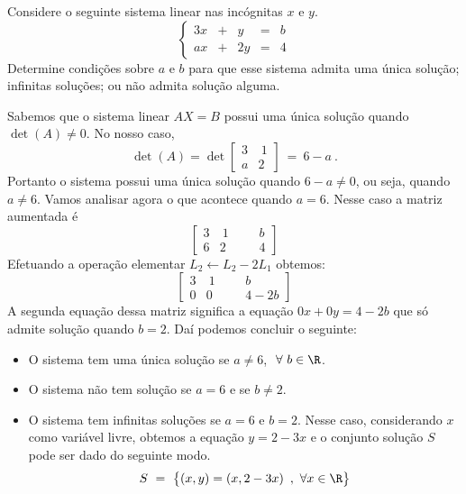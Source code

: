 \begin{problem} 
Considere o seguinte sistema linear nas incógnitas $x$ e $y$.
$$\left\{\begin{array}{rrrrrrr}
3x &  +  &   y &   = &  b  \\
ax &  +  &  2y &   = &  4  \end{array} \right.$$
Determine condições sobre $a$ e $b$ para que esse sistema admita uma única solução; \linebreak 
infinitas soluções; ou não admita solução alguma.
\end{problem}
\begin{solution} Sabemos que o sistema linear $AX=B$ possui uma única solução quando $\det(A) \neq 0$. No nosso caso,
$$ \det(A) = \det\left[\begin{array}{rrr}
  3 & \  1  \\
  a &    2  \end{array}\right]\ =\ 6-a\ . $$
Portanto o sistema possui uma única solução quando $6-a \neq 0$, ou seja, quando $a\neq 6$.
Vamos analisar agora o que acontece quando $a=6$. Nesse caso a matriz aumentada é
$$ \left[\begin{array}{rrr|rr}
  3 & \ 1  & & &   b  \\
  6 &   2  & & &   4  \end{array}\right] $$
Efetuando a operação elementar $L_2 \leftarrow L_2 - 2L_1$ obtemos:
$$ \left[\begin{array}{rrr|rc}
  3 & \ 1  & & &   b     \\
  0 &   0  & & &   4-2b  \end{array}\right] $$
A segunda equação dessa matriz significa a equação $0x+0y=4-2b$ que só admite solução quando $b=2$. Daí podemos concluir o seguinte:
\begin{itemize}
\item O sistema tem uma única solução se $a \neq 6$, $\ \forall\ b \in \R$.
\item O sistema não tem solução se $a=6$ e se $b \neq 2$.
\item O sistema tem infinitas soluções se $a=6$ e $b=2$. Nesse caso, considerando $x$ como variável livre, obtemos a equação
$y=2-3x$ e o conjunto solução $S$ pode ser dado do seguinte modo.
$$S\ =\ \big\{ (x,y) = \left(x, 2-3x \right)\ ,\ \forall x \in \R \big\} $$
\end{itemize}
\end{solution}

